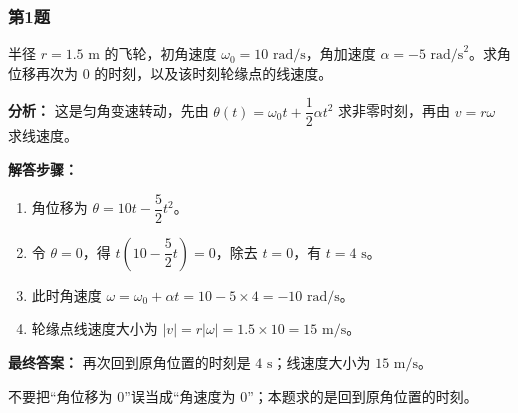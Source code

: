 \documentclass[12pt,a4paper]{ctexart}
\begin{document}
\subsubsection*{第1题}
\begin{tcolorbox}[colback=gray!2!white,colframe=black!60,title={题目}]
半径 \(r=1.5\text{ m}\) 的飞轮，初角速度 \(\omega_0=10\text{ rad/s}\)，角加速度 \(\alpha=-5\text{ rad/s}^2\)。求角位移再次为 0 的时刻，以及该时刻轮缘点的线速度。\par
\end{tcolorbox}
\begin{tcolorbox}[colback=blue!2!white,colframe=blue!55!black,title={完整答案}]
\textbf{分析：}
这是匀角变速转动，先由 \(\theta(t)=\omega_0 t+\dfrac12 \alpha t^2\) 求非零时刻，再由 \(v=r\omega\) 求线速度。\par
\textbf{解答步骤：}
\begin{enumerate}
\item 角位移为 \(\theta=10t-\dfrac52 t^2\)。
\item 令 \(\theta=0\)，得 \(t(10-\dfrac52 t)=0\)，除去 \(t=0\)，有 \(t=4\text{ s}\)。
\item 此时角速度 \(\omega=\omega_0+\alpha t=10-5\times 4=-10\text{ rad/s}\)。
\item 轮缘点线速度大小为 \(|v|=r|\omega|=1.5\times 10=15\text{ m/s}\)。
\end{enumerate}
\textbf{最终答案：}
再次回到原角位置的时刻是 \(4\text{ s}\)；线速度大小为 \(15\text{ m/s}\)。\par
\end{tcolorbox}
\begin{tcolorbox}[colback=red!2!white,colframe=red!55!black,title={易错点}]
不要把“角位移为 0”误当成“角速度为 0”；本题求的是回到原角位置的时刻。\par
\end{tcolorbox}
\end{document}

